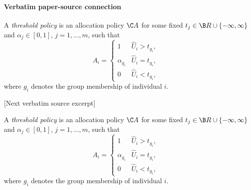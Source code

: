 \documentclass[10pt]{article}
\begin{document}
\paragraph{Verbatim paper-source connection}
\begin{ReviewVerbatim}
\begin{defn}
    A \emph{threshold policy} is an allocation policy \(\C A\) for some fixed \(t_j \in \B R \cup \{-\infty, \infty\}\) and \(\alpha_j \in [0,1]\), \(j = 1, \ldots, m\), such that
        \begin{equation*}
            A_i = \begin{cases}
                1 & \hat U_i > t_{g_i},\\
                \alpha_{g_i} & \hat U_i = t_{g_i}, \\
                0 & \hat U_i < t_{g_i},
            \end{cases}
        \end{equation*}
    where \(g_i\) denotes the group membership of individual \(i\).
\end{defn}

[Next verbatim source excerpt]

\begin{defn}
    A \emph{threshold policy} is an allocation policy \(\C A\) for some fixed \(t_j \in \B R \cup \{-\infty, \infty\}\) and \(\alpha_j \in [0,1]\), \(j = 1, \ldots, m\), such that
        \begin{equation*}
            A_i = \begin{cases}
                1 & \hat U_i > t_{g_i},\\
                \alpha_{g_i} & \hat U_i = t_{g_i}, \\
                0 & \hat U_i < t_{g_i},
            \end{cases}
        \end{equation*}
    where \(g_i\) denotes the group membership of individual \(i\).
\end{defn}
\end{ReviewVerbatim}
\end{document}
